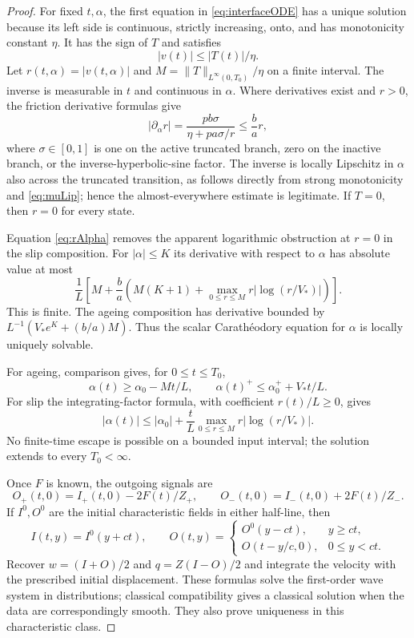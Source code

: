 \documentclass[11pt,a4paper]{article}
\theoremstyle{definition}\newtheorem{definition}[theorem]{Definition}
\theoremstyle{remark}\newtheorem{remark}[theorem]{Remark}
\newcommand{\norm}[1]{\lVert #1\rVert}
\numberwithin{equation}{section}
\begin{document}
\begin{proof}
For fixed $t,\alpha$, the first equation in \eqref{eq:interfaceODE} has a unique solution because its left side is continuous, strictly increasing, onto, and has monotonicity constant $\eta$. It has the sign of $T$ and satisfies
\begin{equation}\label{eq:rBound}
 |v(t)|\le |T(t)|/\eta.
\end{equation}
Let $r(t,\alpha)=|v(t,\alpha)|$ and $M=\norm T_{L^\infty(0,T_0)}/\eta$ on a finite interval. The inverse is measurable in $t$ and continuous in $\alpha$. Where derivatives exist and $r>0$, the friction derivative formulas give
\begin{equation}\label{eq:rAlpha}
 |\partial_\alpha r|
 =\frac{p b\sigma}{\eta+p a\sigma/r}
 \le\frac ba r,
\end{equation}
where $\sigma\in[0,1]$ is one on the active truncated branch, zero on the inactive branch, or the inverse-hyperbolic-sine factor. The inverse is locally Lipschitz in $\alpha$ also across the truncated transition, as follows directly from strong monotonicity and \eqref{eq:muLip}; hence the almost-everywhere estimate is legitimate. If $T=0$, then $r=0$ for every state.

Equation \eqref{eq:rAlpha} removes the apparent logarithmic obstruction at $r=0$ in the slip composition. For $|\alpha|\le K$ its derivative with respect to $\alpha$ has absolute value at most
\[
 \frac1L\left[M+\frac ba\left(M(K+1)+
       \max_{0\le r\le M}r|\log(r/V_*)|\right)\right].
\]
This is finite. The ageing composition has derivative bounded by
$L^{-1}(V_*e^K+(b/a)M)$. Thus the scalar Carath\'eodory equation for $\alpha$ is locally uniquely solvable.

For ageing, comparison gives, for $0\le t\le T_0$,
\begin{equation}\label{eq:contAgeBounds}
 \alpha(t)\ge\alpha_0-Mt/L,\qquad
 \alpha(t)^+\le\alpha_0^++V_*t/L.
\end{equation}
For slip the integrating-factor formula, with coefficient $r(t)/L\ge0$, gives
\begin{equation}\label{eq:contSlipBounds}
 |\alpha(t)|\le|\alpha_0|+
 \frac tL\max_{0\le r\le M}r|\log(r/V_*)|.
\end{equation}
No finite-time escape is possible on a bounded input interval; the solution extends to every $T_0<\infty$.

Once $F$ is known, the outgoing signals are
\[
 O_+(t,0)=I_+(t,0)-2F(t)/Z_+,
 \qquad O_-(t,0)=I_-(t,0)+2F(t)/Z_-.
\]
If $I^0,O^0$ are the initial characteristic fields in either half-line, then
\[
 I(t,y)=I^0(y+ct),\qquad
 O(t,y)=\begin{cases}O^0(y-ct),&y\ge ct,\\
 O(t-y/c,0),&0\le y<ct.
 \end{cases}
\]
Recover $w=(I+O)/2$ and $q=Z(I-O)/2$ and integrate the velocity with the prescribed initial displacement. These formulas solve the first-order wave system in distributions; classical compatibility gives a classical solution when the data are correspondingly smooth. They also prove uniqueness in this characteristic class.


\end{proof}
\end{document}
